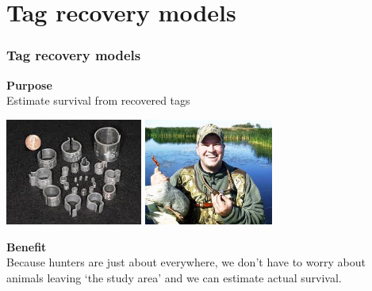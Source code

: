 \documentclass[color=usenames,dvipsnames]{beamer}\usepackage[]{graphicx}\usepackage[]{color}
\begin{document}
\section{Tag recovery models}


\begin{frame}
  \frametitle{Tag recovery models}
  {\bf Purpose} \\
  Estimate survival from recovered tags \\
  \vspace{0.5cm}
  \begin{center}
    \includegraphics[height=3.5cm,keepaspectratio]{figs/metal-bands}
    \hspace{0.5cm}
    \includegraphics[height=3.5cm,keepaspectratio]{figs/duck-hunter}
  \end{center}
  \pause
  {\bf Benefit} \\
  Because hunters are just about everywhere, we don't have to worry
  about animals leaving `the study area' and we can estimate actual
  survival.
\end{frame}
\end{document}
